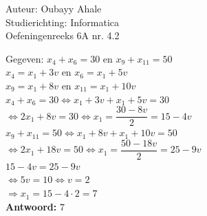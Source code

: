 \documentclass[a4paper]{article}
\begin{document}
  
\noindent \large Auteur: Oubayy Ahale             \\
\noindent \large Studierichting: Informatica      \\
\noindent \large Oefeningenreeks 6A nr. 4.2       \\

\medskip

\normalsize

Gegeven: $ x_4 + x_6 = 30$ en $x_9 + x_{11} = 50 $\\

$ x_4 = x_1 + 3v$ en $x_6 = x_1 + 5v             $\\

$ x_9 = x_1 + 8v$ en $x_{11} = x_1 + 10v         $\\

$ x_4 + x_6 = 30 \Leftrightarrow x_1 + 3v + x_1 + 5v = 30 $\\

$ \Leftrightarrow 2x_1 + 8v = 30 \Leftrightarrow x_1 = \dfrac{30 - 8v}{2} = 15 - 4v $\\

$ x_9 + x_{11} = 50 \Leftrightarrow x_1 + 8v + x_1 + 10v = 50 $\\

$ \Leftrightarrow 2x_1 + 18v = 50 \Leftrightarrow x_1 = \dfrac{50 - 18v}{2} = 25 - 9v $\\

$ 15 - 4v = 25 - 9v                              $\\

$ \Leftrightarrow 5v = 10 \Leftrightarrow v = 2  $\\

$ \Rightarrow x_1 = 15 - 4 \cdot 2 = 7           $\\

\textbf{Antwoord: } $\boxed{7}                   $\\
\end{document}
